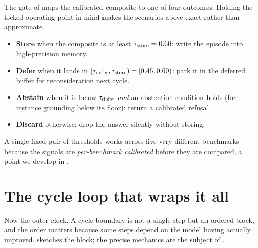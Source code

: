 \begin{bythenumbers}
The gate of  maps the calibrated composite to one of four
outcomes. Holding the locked operating point in mind makes the scenarios above
exact rather than approximate.
\begin{itemize}[leftmargin=1.3em, itemsep=1pt]
  \item \textbf{Store} when the composite is at least $\tau_{\text{store}} = 0.60$: write
  the episode into high-precision memory.
  \item \textbf{Defer} when it lands in $[\tau_{\text{defer}}, \tau_{\text{store}}) = [0.45, 0.60)$:
  park it in the deferred buffer for reconsideration next cycle.
  \item \textbf{Abstain} when it is below $\tau_{\text{defer}}$ \emph{and} an abstention
  condition holds (for instance grounding below its floor): return a calibrated
  refusal.
  \item \textbf{Discard} otherwise: drop the answer silently without storing.
\end{itemize}
A single fixed pair of thresholds works across five very different benchmarks
because the signals are \emph{per-benchmark calibrated} before they are compared,
a point we develop in .
\end{bythenumbers}

\section{The cycle loop that wraps it all}
\label{sec:cycle-loop}

Now the outer clock. A cycle boundary is not a single step but an ordered block,
and the order matters because some steps depend on the model having actually
improved.  sketches the block; the precise mechanics are the
subject of .

